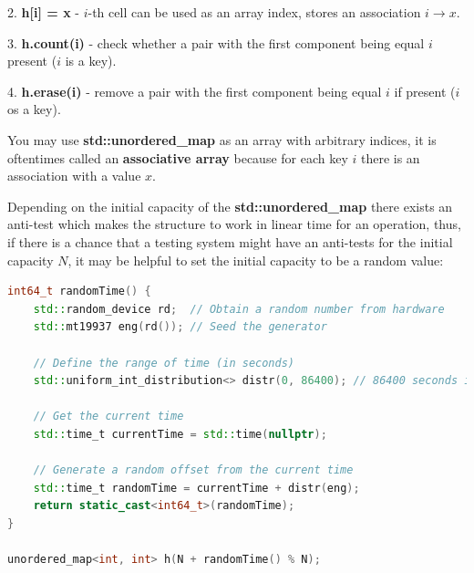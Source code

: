 2. \textbf{h[i] = x} - $i$-th cell can be used as an array index, stores an association $i \to x$.

3. \textbf{h.count(i)} - check whether a pair with the first component being equal $i$ present ($i$ is a key).

4. \textbf{h.erase(i)} - remove a pair  with the first component being equal $i$ if present ($i$ os a key).

You may use \textbf{std::unordered\_map} as an array with arbitrary indices, it is oftentimes called an \textbf{associative array} because for each key $i$ there is an association with a value $x$.

Depending on the initial capacity of the \textbf{std::unordered\_map} there exists an anti-test which makes the structure to work in linear time for an operation, thus, if there is a chance that a testing system might have an anti-tests for the initial capacity $N$, it may be helpful to set the initial capacity to be a random value:

\begin{lstlisting}[language=C++]
int64_t randomTime() {
    std::random_device rd;  // Obtain a random number from hardware
    std::mt19937 eng(rd()); // Seed the generator

    // Define the range of time (in seconds)
    std::uniform_int_distribution<> distr(0, 86400); // 86400 seconds in a day

    // Get the current time
    std::time_t currentTime = std::time(nullptr);

    // Generate a random offset from the current time
    std::time_t randomTime = currentTime + distr(eng);
    return static_cast<int64_t>(randomTime);
}

unordered_map<int, int> h(N + randomTime() % N);
\end{lstlisting}